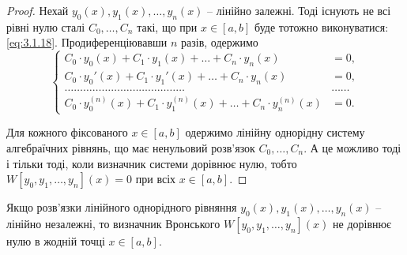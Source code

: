 \begin{proof}
	Нехай $y_0(x), y_1(x), \ldots, y_n(x)$ -- лінійно залежні. Тоді існують не всі рівні нулю сталі $C_0, \ldots, C_n$ такі, що при $x \in [a,b]$ буде тотожно виконуватися: \eqref{eq:3.1.18}.	Продиференціювавши $n$ разів, одержимо 
	\begin{equation}
		\label{eq:3.1.20}
		\left\{ \begin{aligned}
			C_0 \cdot y_0(x) + C_1 \cdot y_1(x) + \ldots + C_n \cdot y_n(x) &= 0, \\
			C_0 \cdot y_0'(x) + C_1 \cdot y_1'(x) + \ldots + C_n \cdot y_n(x) &= 0, \\
			\ldots \ldots \ldots \ldots \ldots \ldots \ldots \ldots \ldots \ldots \ldots \ldots \ldots & \ldots \ldots \\
			C_0 \cdot y_0^{(n)}(x) + C_1 \cdot y_1^{(n)}(x) + \ldots + C_n \cdot y_n^{(n)}(x) &= 0.
		\end{aligned} \right.
	\end{equation}
 
	Для кожного фіксованого $x \in [a,b]$ одержимо лінійну однорідну систему алгебраїчних рівнянь, що має ненульовий розв’язок $C_0, \ldots, C_n$. А це можливо тоді і тільки тоді, коли визначник системи дорівнює нулю, тобто $W[y_0, y_1, \ldots, y_n](x) = 0$ при всіх $x \in [a,b]$.
\end{proof}

\begin{theorem}
	Якщо розв’язки лінійного однорідного рівняння $y_0(x), y_1(x), \ldots, y_n(x)$ -- лінійно незалежні, то визначник Вронського $W[y_0, y_1, \ldots, y_n](x)$ не дорівнює нулю в жодній точці $x \in [a,b]$.
\end{theorem} 

